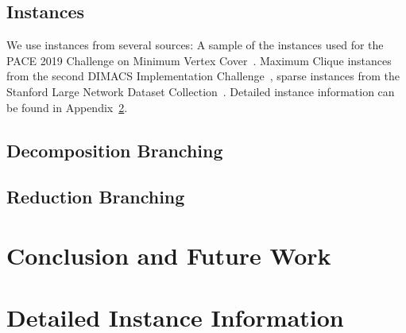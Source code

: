 \documentclass[a4paper,UKenglish,cleveref, autoref, thm-restate]{lipics-v2021}
\begin{document}
\subsection{Instances}
We use instances from several sources: A sample of the instances used for the
PACE 2019 Challenge on Minimum Vertex Cover~\cite{dzulfikar_et_al:LIPIcs:2019:11486}. Maximum Clique instances from the second
DIMACS Implementation Challenge~\cite{johnson1993cliques}, sparse instances from
the Stanford Large Network Dataset Collection~\cite{snapnets}. Detailed instance information can
be found in Appendix~\ref{app:instances}.

\subsection{Decomposition Branching}

\subsection{Reduction Branching}

\section{Conclusion and Future Work}




\appendix

\section{Detailed Instance Information}
\label{app:instances}

\newpage
\end{document}
